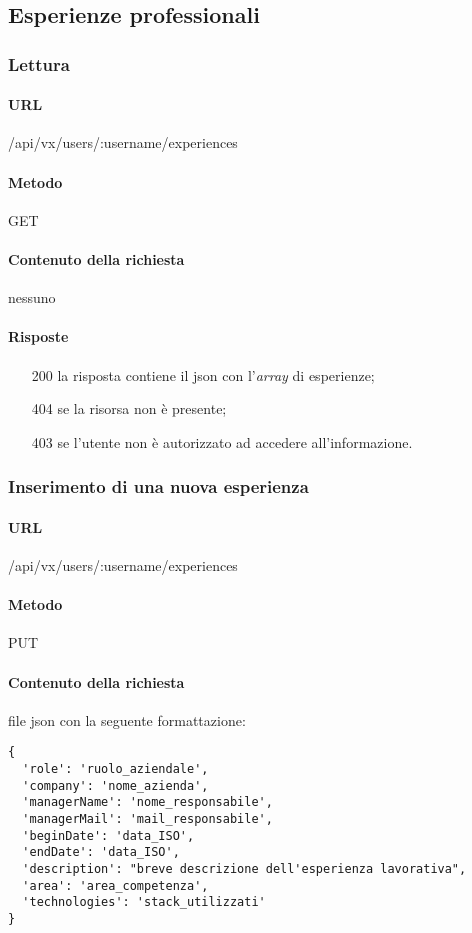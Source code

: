 \subsection{Esperienze professionali}

\subsubsection{Lettura}
\paragraph{URL}
/api/vx/users/:username/experiences
\paragraph{Metodo}
GET
\paragraph{Contenuto della richiesta}
nessuno
\paragraph{Risposte}
\begin{itemize}
	\item[200] la risposta contiene il \gls{json} con l'\emph{array} di esperienze;
	\item[404] se la risorsa non è presente;
	\item[403] se l'utente non è autorizzato ad accedere all'informazione.
\end{itemize}


\subsubsection{Inserimento di una nuova esperienza}
\paragraph{URL}
/api/vx/users/:username/experiences
\paragraph{Metodo}
PUT
\paragraph{Contenuto della richiesta}
file \gls{json} con la seguente formattazione:
\begin{verbatim}
{
  'role': 'ruolo_aziendale',
  'company': 'nome_azienda',
  'managerName': 'nome_responsabile',
  'managerMail': 'mail_responsabile',
  'beginDate': 'data_ISO',
  'endDate': 'data_ISO',
  'description': "breve descrizione dell'esperienza lavorativa",
  'area': 'area_competenza',
  'technologies': 'stack_utilizzati'
}
\end{verbatim}
